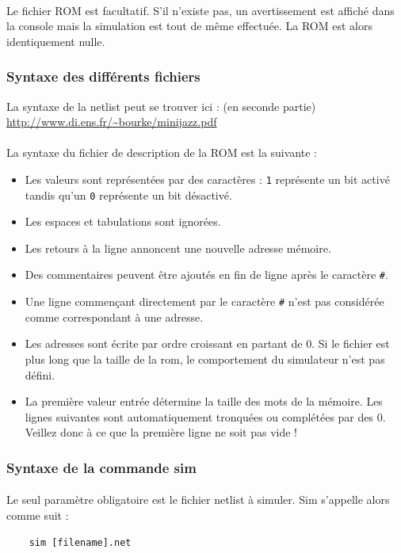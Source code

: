 \documentclass{article}
\begin{document}
\paragraph{}Le fichier ROM est facultatif. S'il n'existe pas, un avertissement est affiché dans la console mais la simulation est tout de même effectuée. La ROM est alors identiquement nulle.


\subsubsection{Syntaxe des différents fichiers}
La syntaxe de la netlist peut se trouver ici : (en seconde partie)\\
\url{http://www.di.ens.fr/~bourke/minijazz.pdf}

\paragraph{}La syntaxe du fichier de description de la ROM est la suivante :
\begin{itemize}
	\item Les valeurs sont représentées par des caractères : \texttt1 représente un bit activé tandis qu'un \texttt0 représente un bit désactivé.
	\item Les espaces et tabulations sont ignorées.
	\item Les retours à la ligne annoncent une nouvelle adresse mémoire.
	\item Des commentaires peuvent être ajoutés en fin de ligne après le caractère \texttt\#.
	\item Une ligne commençant directement par le caractère \texttt\# n'est pas considérée comme correspondant à une adresse.
	\item Les adresses sont écrite par ordre croissant en partant de 0. Si le fichier est plus long que la taille de la rom, le comportement du simulateur n'est pas défini.
	\item La première valeur entrée détermine la taille des mots de la mémoire. Les lignes suivantes sont automatiquement tronquées ou complétées par des 0. Veillez donc à ce que la première ligne ne soit pas vide !
\end{itemize}

\subsubsection{Syntaxe de la commande sim}
\paragraph{}Le seul paramètre obligatoire est le fichier netlist à simuler. Sim s'appelle
alors comme suit :
\begin{verbatim}
	sim [filename].net
\end{verbatim}
\end{document}
